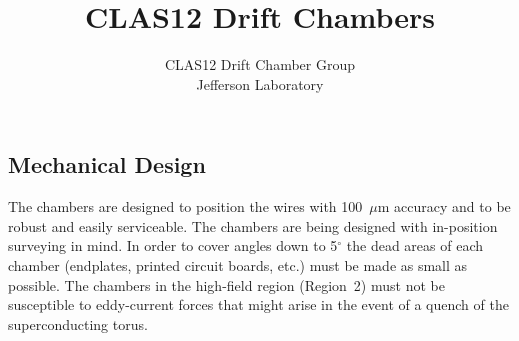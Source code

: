 \documentclass[12pt]{article}
\begin{document}
\title{CLAS12 Drift Chambers}

\author{CLAS12 Drift Chamber Group\\ [0.5ex]
Jefferson Laboratory}

\maketitle

\vspace{2cm}
\begin{figure}[ht]
\begin{center}
\vspace{1cm}
\end{center}
\end{figure}

\vfil
\eject

\tableofcontents

\vfil
\eject
{}
\renewcommand{\headrulewidth}{0pt}
\renewcommand{\footrulewidth}{0pt}
\pagestyle{myheading}







\subsection{Mechanical Design}

The chambers are designed to position the wires with 100~$\mu$m
accuracy and to be robust and easily serviceable.  The chambers are 
being designed with in-position surveying in mind.  In order to cover 
angles down to 5$^\circ$ the dead areas of each chamber (endplates, 
printed circuit boards, etc.) must be made as small as possible.  
The chambers in the high-field region (Region~2) must not be susceptible 
to eddy-current forces that might arise in the event of a quench of the 
superconducting torus.
\end{document}
